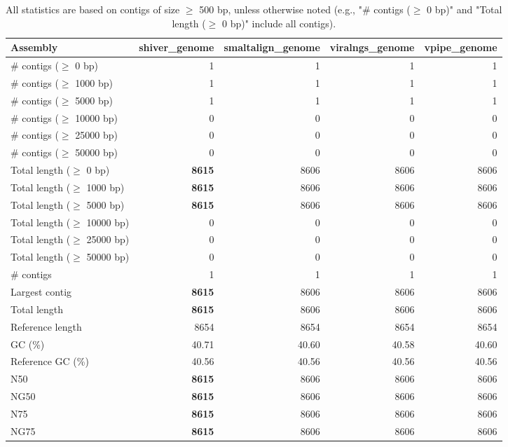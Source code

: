 \documentclass[12pt,a4paper]{article}
\begin{document}
\begin{table}[ht]
\begin{center}
\caption{All statistics are based on contigs of size $\geq$ 500 bp, unless otherwise noted (e.g., "\# contigs ($\geq$ 0 bp)" and "Total length ($\geq$ 0 bp)" include all contigs).}
\begin{tabular}{|l*{4}{|r}|}
\hline
Assembly & shiver\_genome & smaltalign\_genome & viralngs\_genome & vpipe\_genome \\ \hline
\# contigs ($\geq$ 0 bp) & 1 & 1 & 1 & 1 \\ \hline
\# contigs ($\geq$ 1000 bp) & 1 & 1 & 1 & 1 \\ \hline
\# contigs ($\geq$ 5000 bp) & 1 & 1 & 1 & 1 \\ \hline
\# contigs ($\geq$ 10000 bp) & 0 & 0 & 0 & 0 \\ \hline
\# contigs ($\geq$ 25000 bp) & 0 & 0 & 0 & 0 \\ \hline
\# contigs ($\geq$ 50000 bp) & 0 & 0 & 0 & 0 \\ \hline
Total length ($\geq$ 0 bp) & {\bf 8615} & 8606 & 8606 & 8606 \\ \hline
Total length ($\geq$ 1000 bp) & {\bf 8615} & 8606 & 8606 & 8606 \\ \hline
Total length ($\geq$ 5000 bp) & {\bf 8615} & 8606 & 8606 & 8606 \\ \hline
Total length ($\geq$ 10000 bp) & 0 & 0 & 0 & 0 \\ \hline
Total length ($\geq$ 25000 bp) & 0 & 0 & 0 & 0 \\ \hline
Total length ($\geq$ 50000 bp) & 0 & 0 & 0 & 0 \\ \hline
\# contigs & 1 & 1 & 1 & 1 \\ \hline
Largest contig & {\bf 8615} & 8606 & 8606 & 8606 \\ \hline
Total length & {\bf 8615} & 8606 & 8606 & 8606 \\ \hline
Reference length & 8654 & 8654 & 8654 & 8654 \\ \hline
GC (\%) & 40.71 & 40.60 & 40.58 & 40.60 \\ \hline
Reference GC (\%) & 40.56 & 40.56 & 40.56 & 40.56 \\ \hline
N50 & {\bf 8615} & 8606 & 8606 & 8606 \\ \hline
NG50 & {\bf 8615} & 8606 & 8606 & 8606 \\ \hline
N75 & {\bf 8615} & 8606 & 8606 & 8606 \\ \hline
NG75 & {\bf 8615} & 8606 & 8606 & 8606 \\ \hline

\end{tabular}
\end{center}
\end{table}
\end{document}
